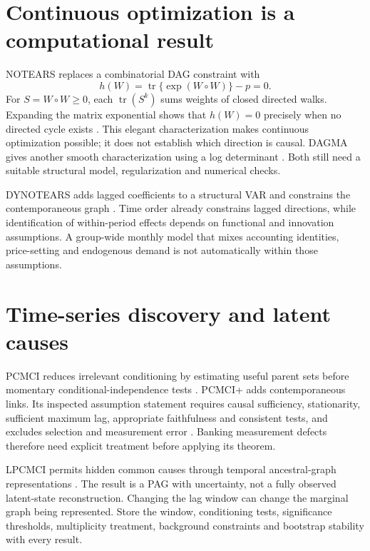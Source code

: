 \section{Continuous optimization is a computational result}
NOTEARS replaces a combinatorial DAG constraint with
\begin{equation}
 h(W)=\operatorname{tr}\{\exp(W\circ W)\}-p=0.
 \label{eq:notears}
\end{equation}
For $S=W\circ W\geq0$, each $\operatorname{tr}(S^k)$ sums weights
of closed directed walks. Expanding the matrix exponential shows that
$h(W)=0$ precisely when no directed cycle exists
\citep{notears2018}. This elegant characterization makes continuous
optimization possible; it does not establish which direction is causal.
DAGMA gives another smooth characterization using a log determinant
\citep{dagma2022}. Both still need a suitable structural model, regularization
and numerical checks.

DYNOTEARS adds lagged coefficients to a structural VAR and constrains the
contemporaneous graph \citep{pamfil2020}. Time order already constrains
lagged directions, while identification of within-period effects depends
on functional and innovation assumptions. A group-wide monthly model that
mixes accounting identities, price-setting and endogenous demand is not
automatically within those assumptions.

\section{Time-series discovery and latent causes}
PCMCI reduces irrelevant conditioning by estimating useful parent sets
before momentary conditional-independence tests \citep{runge2019}.
PCMCI+ adds contemporaneous links. Its inspected assumption statement
requires causal sufficiency, stationarity, sufficient maximum lag,
appropriate faithfulness and consistent tests, and excludes selection and
measurement error \citep{runge2020}. Banking measurement defects therefore
need explicit treatment before applying its theorem.

LPCMCI permits hidden common causes through temporal ancestral-graph
representations \citep{gerhardus2020}. The result is a PAG with uncertainty,
not a fully observed latent-state reconstruction. Changing the lag window
can change the marginal graph being represented. Store the window,
conditioning tests, significance thresholds, multiplicity treatment,
background constraints and bootstrap stability with every result.


